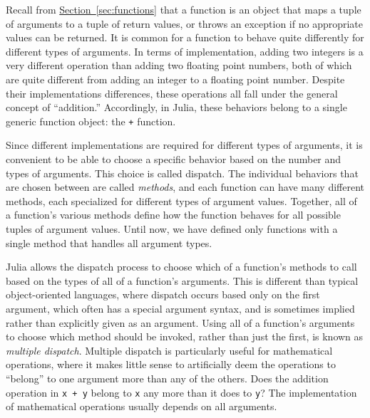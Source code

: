 \documentclass{article}
\newcommand{\Section}[1]{\hyperref[sec:#1]{Section~\ref*{sec:#1}}}
\begin{document}
Recall from \Section{functions} that a function is an object that maps a tuple of arguments to a tuple of return values, or throws an exception if no appropriate values can be returned.
It is common for a function to behave quite differently for different types of arguments.
In terms of implementation, adding two integers is a very different operation than adding two floating point numbers, both of which are quite different from adding an integer to a floating point number.
Despite their implementations differences, these operations all fall under the general concept of ``addition.''
Accordingly, in Julia, these behaviors belong to a single generic function object: the \verb|+| function.

Since different implementations are required for different types of arguments, it is convenient to be able to choose a specific behavior based on the number and types of arguments.
This choice is called dispatch.
The individual behaviors that are chosen between are called \emph{methods}, and each function can have many different methods, each specialized for different types of argument values.
Together, all of a function's various methods define how the function behaves for all possible tuples of argument values.
Until now, we have defined only functions with a single method that handles all argument types.

Julia allows the dispatch process to choose which of a function's methods to call based on the types of all of a function's arguments.
This is different than typical object-oriented languages, where dispatch occurs based only on the first argument, which often has a special argument syntax, and is sometimes implied rather than explicitly given as an argument.
Using all of a function's arguments to choose which method should be invoked, rather than just the first, is known as \emph{multiple dispatch}.
Multiple dispatch is particularly useful for mathematical operations, where it makes little sense to artificially deem the operations to ``belong'' to one argument more than any of the others.
Does the addition operation in \verb|x + y| belong to \verb|x| any more than it does to \verb|y|?
The implementation of mathematical operations usually depends on all arguments.
\end{document}
